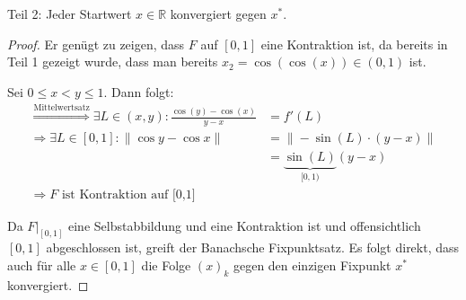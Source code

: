 Teil 2: Jeder Startwert $x \in \mathbb{R}$ konvergiert gegen $x^*$.

\begin{proof}
Er genügt zu zeigen, dass $F$ auf $[0,1]$ eine Kontraktion ist, da
bereits in Teil 1 gezeigt wurde, dass man bereits $x_2 = \cos(\cos(x)) \in (0,1)$ ist.

Sei $0 \leq x < y \leq 1$. Dann folgt:
\begin{align}
    \stackrel{\text{Mittelwertsatz}}{\Rightarrow} \exists L \in (x,y): \frac{\cos(y) - \cos(x)}{y-x} &= f'(L)\\
    \Rightarrow \exists L \in [0,1]: \| \cos y - \cos x \| &= \| - \sin(L) \cdot (y-x)\| \\
    &= \underbrace{\sin(L)}_{[0,1)} (y-x)\\
   \Rightarrow F \text{ ist Kontraktion auf [0,1]}
\end{align}

Da $F|_{[0,1]}$ eine Selbstabbildung und eine Kontraktion ist und
offensichtlich $[0,1]$ abgeschlossen ist, greift der 
Banachsche Fixpunktsatz. Es folgt direkt, dass auch für alle $x \in [0,1]$
die Folge $(x)_k$ gegen den einzigen Fixpunkt $x^*$ konvergiert.

\end{proof}
